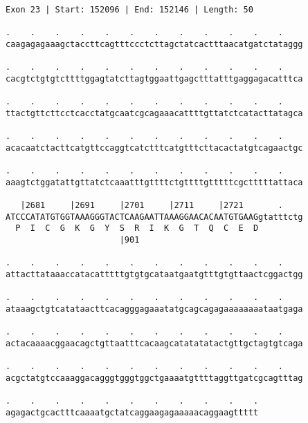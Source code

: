 \documentclass{article}
\begin{document}
\begin{Verbatim}
Exon 23 | Start: 152096 | End: 152146 | Length: 50
 
.    .    .    .    .    .    .    .    .    .    .    .    
caagagagaaagctaccttcagtttccctcttagctatcactttaacatgatctataggg
  
.    .    .    .    .    .    .    .    .    .    .    .    
cacgtctgtgtcttttggagtatcttagtggaattgagctttatttgaggagacatttca
  
.    .    .    .    .    .    .    .    .    .    .    .    
ttactgttcttcctcacctatgcaatcgcagaaacattttgttatctcatacttatagca
  
.    .    .    .    .    .    .    .    .    .    .    .    
acacaatctacttcatgttccaggtcatctttcatgtttcttacactatgtcagaactgc
  
.    .    .    .    .    .    .    .    .    .    .    .    
aaagtctggatattgttatctcaaatttgttttctgttttgtttttcgctttttattaca
  
   |2681     |2691     |2701     |2711     |2721       .    
ATCCCATATGTGGTAAAGGGTACTCAAGAATTAAAGGAACACAATGTGAAGgtatttctg
  P  I  C  G  K  G  Y  S  R  I  K  G  T  Q  C  E  D         
                       |901                                 
  
.    .    .    .    .    .    .    .    .    .    .    .    
attacttataaaccatacatttttgtgtgcataatgaatgtttgtgttaactcggactgg
  
.    .    .    .    .    .    .    .    .    .    .    .    
ataaagctgtcatataacttcacagggagaaatatgcagcagagaaaaaaaataatgaga
  
.    .    .    .    .    .    .    .    .    .    .    .    
actacaaaacggaacagctgttaatttcacaagcatatatatactgttgctagtgtcaga
  
.    .    .    .    .    .    .    .    .    .    .    .    
acgctatgtccaaaggacagggtgggtggctgaaaatgttttaggttgatcgcagtttag
  
.    .    .    .    .    .    .    .    .    .    .
agagactgcactttcaaaatgctatcaggaagagaaaaacaggaagttttt
\end{Verbatim}
\newpage
\end{document}
